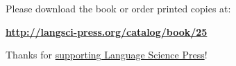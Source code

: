 \documentclass{article}
\begin{document}
Please download the book or order printed copies at:

\bigskip

\textbf{\url{http://langsci-press.org/catalog/book/25}}

\bigskip

Thanks for \href{http://langsci-press.org/about/support}{supporting Language Science Press}!
\end{document}
